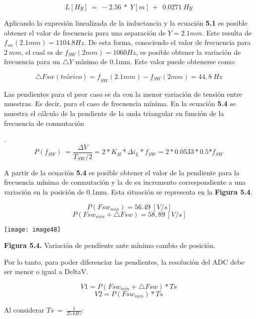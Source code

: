 \documentclass{article} %
\begin{document}
\noindent 
\begin{equation} \label{GrindEQ__5_3_} 
L[Hy]\ =\ -2.56\ *\ Y[m]\ +\ \ 0.0271\ Hy 
\end{equation} 


\noindent Aplicando la expresi\'{o}n linealizada de la inductancia y la ecuaci\'{o}n\textbf{ 5.1 }es posible obtener el valor de frecuencia para una separaci\'{o}n de $Y=2.1mm$. Este resulta de$f_{sw}(2.1mm)=1104.8Hz$. De esta forma, conociendo el valor de frecuencia para $2\ mm$, el cual es de $f_{SW}(2mm)=1060Hz$, es posible obtener la variaci\'{o}n de frecuencia para un $\triangle Y$ m\'{i}nimo de 0.1mm. Este valor puede obtenerse como:

\noindent  
\[{\triangle Fsw(te\textrm{\'{o}}rico)=f}_{SW}(2.1mm)-f_{SW}(2mm)=44,8\ Hz\] 


\noindent Las pendientes para el peor caso se da con la menor variaci\'{o}n de tensi\'{o}n entre muestras. Es decir, para el caso de frecuencia m\'{i}nima. En la ecuaci\'{o}n\textbf{ 5.4 }se muestra el c\'{a}lculo de la pendiente de la onda triangular en funci\'{o}n de la frecuencia de conmutaci\'{o}n

\noindent .
\begin{equation} \label{GrindEQ__5_4_} 
P(f_{SW})\ =\frac{\mathit{\Delta}V}{T_{SW}/2}=2*K_H*\mathit{\Delta}i_L*f_{SW}=2*0.0533*0.5{*f}_{SW} 
\end{equation} 


\noindent A partir de la ecuaci\'{o}n\textbf{ 5.4 }es posible obtener el valor de la pendiente para la frecuencia m\'{i}nima de conmutaci\'{o}n y la de su incremento correspondiente a una variaci\'{o}n en la posici\'{o}n de 0.1mm. Esta situaci\'{o}n se representa en la\textbf{ Figura 5.4}.

\noindent 
\[\ P({Fsw}_{min})=56.49\ [V/s]\] 
\[\ P({Fsw}_{min}+\triangle Fsw)=58,89\ [V/s]\] 


\noindent \texttt{[image: image48]}

\noindent \textbf{Figura 5.4. }Variaci\'{o}n de pendiente ante m\'{i}nimo cambio de posici\'{o}n.

\noindent 

\noindent Por lo tanto, para poder diferenciar las pendientes, la resoluci\'{o}n del ADC debe ser menor o igual a DeltaV.

\noindent 
\[V1=P({Fsw}_{min}+\triangle Fsw)*Ts\] 
\[V2=P({Fsw}_{min})*Ts\] 


\noindent Al considerar $Ts\ =\ \frac{1}{25\ kHz}$:
\end{document}
